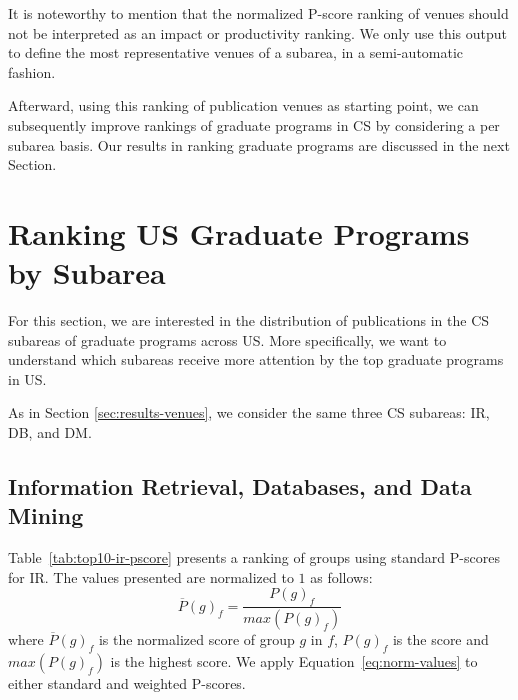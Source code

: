 \documentclass[msc]{ppgccufmg}
\begin{document}
It is noteworthy to mention that the normalized P-score ranking of venues should not be interpreted as an impact or productivity ranking. We only use this output to define the most representative venues of a subarea, in a semi-automatic fashion.

Afterward, using this ranking of publication venues as starting point, we can subsequently improve rankings of graduate programs in CS by considering a per subarea basis. Our results in ranking graduate programs are discussed in the next Section.

\section{Ranking US Graduate Programs by Subarea}\label{sec:results-us}

For this section, we are interested in the distribution of publications in the CS subareas of graduate programs across US. More specifically, we want to understand which subareas receive more attention by the top graduate programs in US. 

As in Section \ref{sec:results-venues}, we consider the same three CS subareas: IR, DB, and DM.

\subsection*{Information Retrieval, Databases, and Data Mining}
Table~\ref{tab:top10-ir-pscore} presents a ranking of groups using standard P-scores for IR. The values presented are normalized to $1$ as follows:
\begin{equation}\label{eq:norm-values}
    \overline{P}(g)_{f} = \frac{P(g)_{f}}{max(P(g)_{f})}
\end{equation}
where $\overline{P}(g)_{f}$ is the normalized score of group $g$ in $f$, $P(g)_{f}$ is the score and $max(P(g)_{f})$ is the highest score. We apply Equation~\ref{eq:norm-values} to either standard and weighted P-scores.
\end{document}
